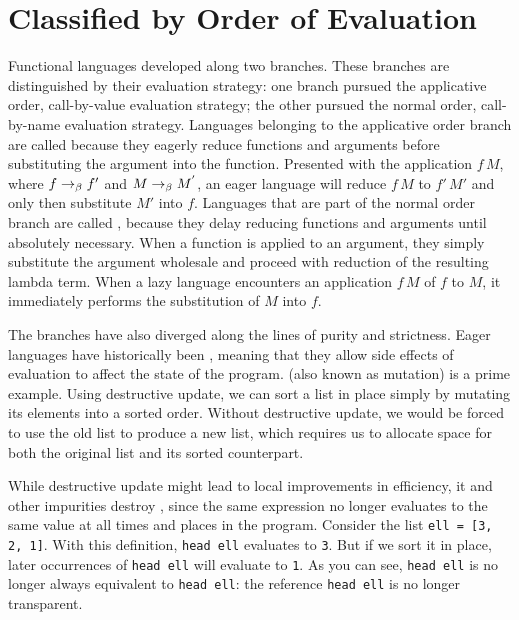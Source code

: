 \section{Classified by Order of Evaluation}
Functional languages developed along two branches. These branches are distinguished by their evaluation strategy: one branch pursued the applicative order, call-by-value evaluation strategy; the other pursued the normal order, call-by-name evaluation strategy. Languages belonging to the applicative order branch are called  because they eagerly reduce functions and arguments before substituting the argument into the function. Presented with the application $f\, M$, where $f \betared f\prime$ and $M \betared M'$, an eager language will reduce $f\, M$ to $f\prime\, M\prime$ and only then substitute $M\prime$ into $f$. Languages that are part of the normal order branch are called , because they delay reducing functions and arguments until absolutely necessary. When a function is applied to an argument, they simply substitute the argument wholesale and proceed with reduction of the resulting lambda term. When a lazy language encounters an application $f\, M$ of $f$ to $M$, it immediately performs the substitution of $M$ into $f$.

The branches have also diverged along the lines of purity and strictness. Eager languages have historically been , meaning that they allow side effects of evaluation to affect the state of the program.  (also known as mutation) is a prime example. Using destructive update, we can sort a list in place simply by mutating its elements into a sorted order. Without destructive update, we would be forced to use the old list to produce a new list, which requires us to allocate space for both the original list and its sorted counterpart.

While destructive update might lead to local improvements in efficiency, it and other impurities destroy , since the same expression no longer evaluates to the same value at all times and places in the program. Consider the list \lstinline{ell = [3, 2, 1]}. With this definition, \lstinline{head ell} evaluates to \lstinline{3}. But if we sort it in place, later occurrences of \lstinline{head ell} will evaluate to \lstinline{1}. As you can see, \lstinline{head ell} is no longer always equivalent to \lstinline{head ell}: the reference \lstinline{head ell} is no longer transparent.

